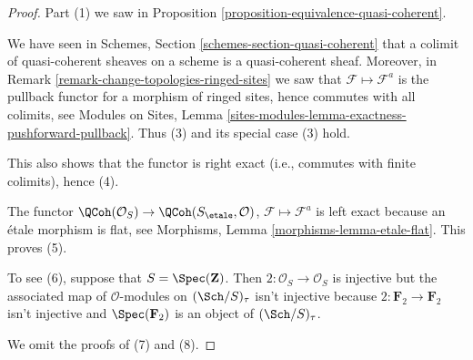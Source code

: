\begin{proof}
Part (1) we saw in
Proposition \ref{proposition-equivalence-quasi-coherent}.

\medskip\noindent
We have seen in
Schemes, Section \ref{schemes-section-quasi-coherent}
that a colimit of quasi-coherent sheaves on a scheme is a quasi-coherent
sheaf. Moreover, in
Remark \ref{remark-change-topologies-ringed-sites}
we saw that $\mathcal{F} \mapsto \mathcal{F}^a$ is the pullback functor
for a morphism of ringed sites, hence commutes with all colimits, see
Modules on Sites, Lemma
\ref{sites-modules-lemma-exactness-pushforward-pullback}.
Thus (3) and its special case (3) hold.

\medskip\noindent
This also shows that the functor is right exact (i.e., commutes with
finite colimits), hence (4).

\medskip\noindent
The functor $\QCoh(\mathcal{O}_S) \to
\QCoh(S_\etale, \mathcal{O})$,
$\mathcal{F} \mapsto \mathcal{F}^a$
is left exact because an \'etale morphism is flat, see
Morphisms, Lemma \ref{morphisms-lemma-etale-flat}.
This proves (5).

\medskip\noindent
To see (6), suppose that $S = \Spec(\mathbf{Z})$.
Then $2 : \mathcal{O}_S \to \mathcal{O}_S$ is injective but the associated
map of $\mathcal{O}$-modules on $(\Sch/S)_\tau$ isn't
injective because $2 : \mathbf{F}_2 \to \mathbf{F}_2$ isn't injective
and $\Spec(\mathbf{F}_2)$ is an object of $(\Sch/S)_\tau$.

\medskip\noindent
We omit the proofs of (7) and (8).


\end{proof}

